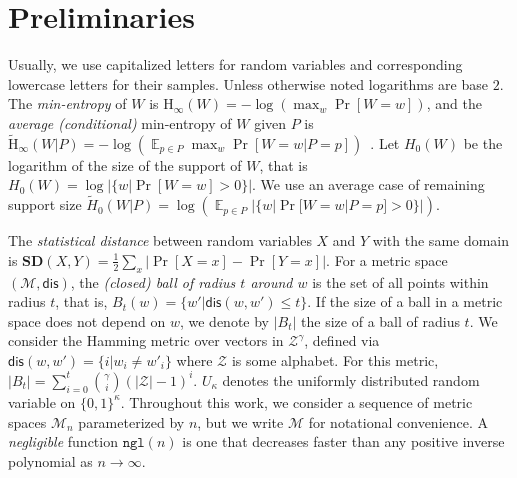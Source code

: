 \documentclass[11pt]{article}
\DeclareMathOperator*{\expe}{\mathbb{E}}
\newcommand{\dis}{\ensuremath{\mathsf{dis}}}
\newcommand{\ngl}{\ensuremath{\mathtt{ngl}}\xspace}
\newcommand{\Hoo}{\mathrm{H}_\infty}
\newcommand{\Hav}{\tilde{\mathrm{H}}_\infty}
\newcommand{\sd}{\ensuremath{\mathbf{SD}}}
\begin{document}
\section{Preliminaries}
\label{sec:preliminaries}
Usually, we use capitalized letters for random variables and corresponding lowercase letters for their samples.
 Unless otherwise noted logarithms are base $2$.
The {\em min-entropy} of $W$ is $\Hoo(W) = -\log(\max_w \Pr[W=w])$,
and the {\em average (conditional)} min-entropy of $W$ given $P$ is  $\Hav(W|P) = -\log(\expe_{p\in P} \max_{w} \Pr[W=w|P=p])$~\cite[Section 2.4]{DBLP:journals/siamcomp/DodisORS08}.   Let $H_0(W)$ be the logarithm of the size of the support of $W$,  that is $H_0(W) = \log |\{w | \Pr[W=w]>0\}|$.  We use an average case of remaining support size $\tilde{H}_0(W |P) = \log ( \expe_{p\in P} |\{w | \Pr[W=w |P=p]>0\}|)$.

The {\em statistical distance} between random variables $X$ and $Y$ with the same domain is $\sd(X,Y) = \frac12 \sum_x |\Pr[X=x] - \Pr[Y=x]|$.
For a metric space $(\mathcal{M}, \dis)$, the \emph{(closed) ball of radius $t$ around $w$} is the set of all points within radius $t$, that is, $B_t(w) = \{w'| \dis(w, w')\leq t\}$.  If the size of a ball in a metric space does not depend on $w$, we denote by $|B_t|$ the size of a ball of radius $t$.  We consider the Hamming metric over vectors in $\mathcal{Z}^\gamma$, defined via $\dis(w,w') = \{i | w_i \neq w'_i\}$ where $\mathcal{Z}$ is some alphabet.  For this metric, $|B_t| = \sum_{i=0}^t {\gamma \choose i} (|\mathcal{Z}|-1)^i $.  $U_\kappa$ denotes the uniformly  distributed random variable on $\{0,1\}^\kappa$.  Throughout this work, we consider a sequence of metric spaces $\mathcal{M}_n$ parameterized by $n$, but we write $\mathcal{M}$ for notational convenience. A \emph{negligible} function $\ngl(n)$ is one that decreases faster than any positive inverse polynomial as $n\rightarrow \infty$.
\end{document}
